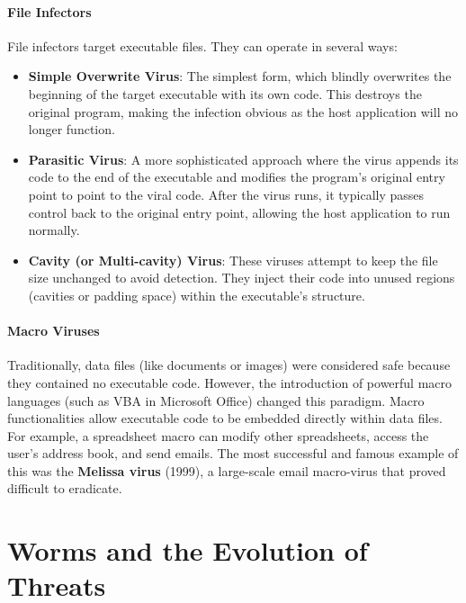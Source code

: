 \paragraph{File Infectors}
File infectors target executable files. They can operate in several ways:
\begin{itemize}
    \item \textbf{Simple Overwrite Virus}: The simplest form, which blindly overwrites the beginning of the target executable with its own code. This destroys the original program, making the infection obvious as the host application will no longer function.
    \item \textbf{Parasitic Virus}: A more sophisticated approach where the virus appends its code to the end of the executable and modifies the program's original entry point to point to the viral code. After the virus runs, it typically passes control back to the original entry point, allowing the host application to run normally.
    \item \textbf{Cavity (or Multi-cavity) Virus}: These viruses attempt to keep the file size unchanged to avoid detection. They inject their code into unused regions (cavities or padding space) within the executable's structure.
\end{itemize}

\paragraph{Macro Viruses}
Traditionally, data files (like documents or images) were considered safe because they contained no executable code. However, the introduction of powerful macro languages (such as VBA in Microsoft Office) changed this paradigm. Macro functionalities allow executable code to be embedded directly within data files. For example, a spreadsheet macro can modify other spreadsheets, access the user's address book, and send emails. The most successful and famous example of this was the \textbf{Melissa virus} (1999), a large-scale email macro-virus that proved difficult to eradicate.

\section{Worms and the Evolution of Threats}


